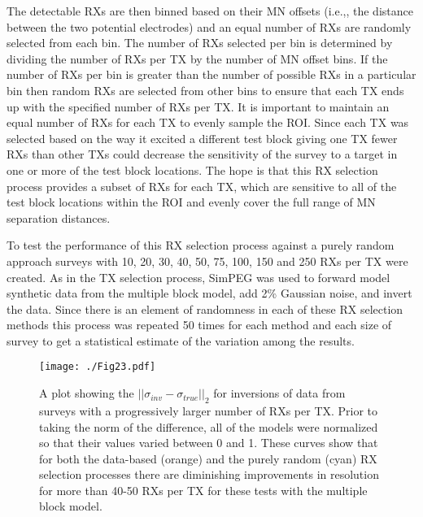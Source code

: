 \documentclass[preprint,authoryear,12pt]{elsarticle}
\begin{document}
The detectable RXs are then binned based on their MN offsets (i.e.,, the distance between the two potential electrodes) and an equal number of RXs are randomly selected from each bin. The number of RXs selected per bin is determined by dividing the number of RXs per TX by the number of MN offset bins. If the number of RXs per bin is greater than the number of possible RXs in a particular bin then random RXs are selected from other bins to ensure that each TX ends up with the specified number of RXs per TX. It is important to maintain an equal number of RXs for each TX to evenly sample the ROI. Since each TX was selected based on the way it excited a different test block giving one TX fewer RXs than other TXs could decrease the sensitivity of the survey to a target in one or more of the test block locations. The hope is that this RX selection process provides a subset of RXs for each TX, which are sensitive to all of the test block locations within the ROI and evenly cover the full range of MN separation distances.

To test the performance of this RX selection process against a purely random approach surveys with 10, 20, 30, 40, 50, 75, 100, 150 and 250 RXs per TX were created. As in the TX selection process, SimPEG was used to forward model synthetic data from the multiple block model, add 2\% Gaussian noise, and invert the data. Since there is an element of randomness in each of these RX selection methods this process was repeated 50 times for each method and each size of survey to get a statistical estimate of the variation among the results.


\begin{figure} [htp]
   \begin{center}
      \texttt{[image: ./Fig23.pdf]}
   \end{center}
   \vspace{-0.5cm}
\caption{A plot showing the $\left|| \sigma_{inv} - \sigma_{true} \right||_2$ for inversions of data from surveys with a progressively larger number of RXs per TX. Prior to taking the norm of the difference, all of the models were normalized so that their values varied between 0 and 1. These curves show that for both the data-based (orange) and the purely random (cyan) RX selection processes there are diminishing improvements in resolution for more than 40-50 RXs per TX for these tests with the multiple block model.}
\label{fig:SurveyDesignComp_StraightTunnel_MultiBlk_RxSelection}
\end{figure}
\end{document}
